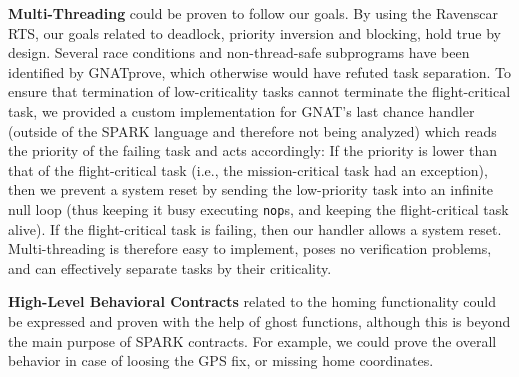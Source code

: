
\textbf{Multi-Threading} could be proven to follow our goals. By using the Ravenscar RTS, 
our goals related to deadlock, priority inversion and blocking, hold true by design.
Several
race conditions and non-thread-safe subprograms have been identified by GNATprove, which otherwise would have refuted task separation. To ensure that
termination of low-criticality tasks cannot terminate the flight-critical task, we
provided a custom implementation for GNAT's last chance handler 
(outside of the SPARK language and therefore not being analyzed) which
reads the priority of the failing task %
and acts accordingly: If the priority is lower than
that of the flight-critical task (i.e., the mission-critical
task had an exception), then we prevent a system reset by sending the
low-priority task into an infinite null loop (thus keeping it busy
executing \texttt{nop}s, and keeping the flight-critical task alive). 
If the flight-critical task is failing, then our handler allows a system reset. 
Multi-threading is therefore easy to
implement, poses no verification problems, and can effectively
separate tasks by their criticality.

\textbf{High-Level Behavioral Contracts} related to the homing functionality could
be expressed and proven with the help of ghost functions, although this is beyond the main purpose of SPARK contracts. For example, we could prove the overall behavior in case of loosing the GPS fix, or missing home coordinates. 





